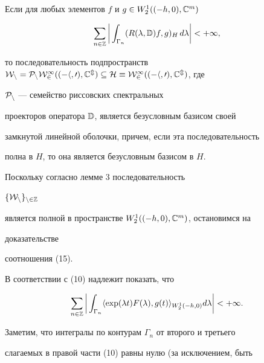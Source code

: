 \begin{lem} 


Если для любых элементов $f$ и $g\in W^1_2((-h,0),\Bbb C^m)$ 


\begin{equation} 


\sum_{n\in\Bbb Z}\bigg|\int_{\Gamma_n} 


(R(\lambda,\Bbb D)f,g)_H\,d\lambda\bigg|<+\infty, 


\end{equation} 


то последовательность подпространств $\cal W_n=\cal P_n 


W^1_2((-h,0),\Bbb C^m)\subseteq H\equiv W^1_2((-h,0),\Bbb C^m)$, где 


$\cal P_n$ --- семейство риссовских спектральных 


проекторов оператора $\Bbb D$, является безусловным базисом своей 


замкнутой линейной оболочки, причем, если эта последовательность 


полна в $H$, то она является безусловным базисом в $H$. 


\end{lem} 


 


Поскольку согласно лемме 3 последовательность 


$\{\cal W_n\}_{n\in\Bbb Z}$ 


является полной в пространстве $W^1_2((-h,0),\Bbb C^m)$, остановимся на 


доказательстве 


соотношения (15). 


 


В соответствии с (10) надлежит показать, что 


\begin{equation} 


\sum_{n\in\Bbb Z}\bigg|\int_{\Gamma_n}\langle\exp(\lambda t) 


F(\lambda),g(t)\rangle_{W^1_2(-h,0)}d\lambda\bigg|<+\infty. 


\end{equation} 


 


Заметим, что интегралы по контурам $\Gamma_n$ от второго и третьего 


слагаемых в правой части (10) равны нулю (за исключением, быть 


